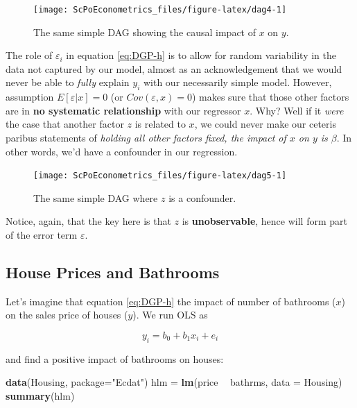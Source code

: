 \documentclass[]{book}
\newenvironment{Shaded}{\begin{snugshade}}{\end{snugshade}}
\newcommand{\KeywordTok}[1]{\textcolor[rgb]{0.13,0.29,0.53}{\textbf{#1}}}
\newcommand{\DataTypeTok}[1]{\textcolor[rgb]{0.13,0.29,0.53}{#1}}
\newcommand{\StringTok}[1]{\textcolor[rgb]{0.31,0.60,0.02}{#1}}
\newcommand{\OperatorTok}[1]{\textcolor[rgb]{0.81,0.36,0.00}{\textbf{#1}}}
\newcommand{\NormalTok}[1]{#1}
\begin{document}
\begin{figure}

{\centering \texttt{[image: ScPoEconometrics\_files/figure-latex/dag4-1]} 

}

\caption{The same simple DAG showing the causal impact of $x$ on $y$.}\label{fig:dag4}
\end{figure}

The role of \(\varepsilon_i\) in equation \eqref{eq:DGP-h} is to allow for
random variability in the data not captured by our model, almost as an
acknowledgement that we would never be able to \emph{fully} explain
\(y_i\) with our necessarily simple model. However, assumption
\(E[\varepsilon|x] = 0\) (or \(Cov(\varepsilon,x) = 0\)) makes sure that
those other factors are in \textbf{no systematic relationship} with our
regressor \(x\). Why? Well if it \emph{were} the case that another
factor \(z\) is related to \(x\), we could never make our ceteris
paribus statements of \emph{holding all other factors fixed, the impact
of \(x\) on \(y\) is \(\beta\)}. In other words, we'd have a confounder
in our regression.

\begin{figure}

{\centering \texttt{[image: ScPoEconometrics\_files/figure-latex/dag5-1]} 

}

\caption{The same simple DAG where $z$ is a confounder.}\label{fig:dag5}
\end{figure}

Notice, again, that the key here is that \(z\) is \textbf{unobservable},
hence will form part of the error term \(\varepsilon\).

\subsection{House Prices and
Bathrooms}\label{house-prices-and-bathrooms}

Let's imagine that equation \eqref{eq:DGP-h} the impact of number of
bathrooms (\(x\)) on the sales price of houses (\(y\)). We run OLS as

\[
y_i = b_0 + b_1 x_i + e_i 
\]

and find a positive impact of bathrooms on houses:

\begin{Shaded}
\begin{Highlighting}[]
\KeywordTok{data}\NormalTok{(Housing, }\DataTypeTok{package=}\StringTok{"Ecdat"}\NormalTok{)}
\NormalTok{hlm =}\StringTok{ }\KeywordTok{lm}\NormalTok{(price }\OperatorTok{~}\StringTok{ }\NormalTok{bathrms, }\DataTypeTok{data =}\NormalTok{ Housing)}
\KeywordTok{summary}\NormalTok{(hlm)}
\end{Highlighting}
\end{Shaded}
\end{document}
